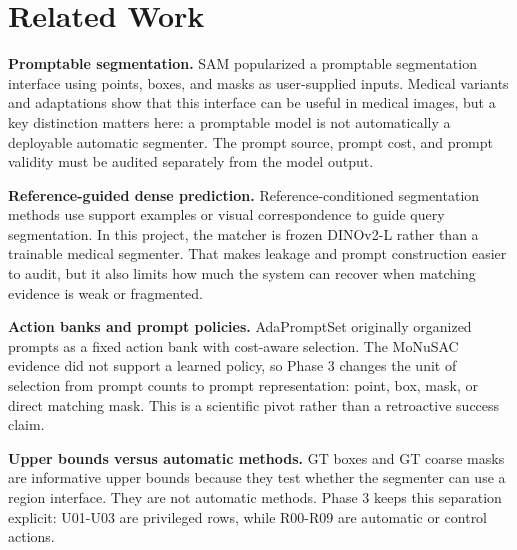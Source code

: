 \section{Related Work}

\textbf{Promptable segmentation.}
SAM popularized a promptable segmentation interface using points, boxes, and masks as user-supplied inputs. Medical variants and adaptations show that this interface can be useful in medical images, but a key distinction matters here: a promptable model is not automatically a deployable automatic segmenter. The prompt source, prompt cost, and prompt validity must be audited separately from the model output.

\textbf{Reference-guided dense prediction.}
Reference-conditioned segmentation methods use support examples or visual correspondence to guide query segmentation. In this project, the matcher is frozen DINOv2-L rather than a trainable medical segmenter. That makes leakage and prompt construction easier to audit, but it also limits how much the system can recover when matching evidence is weak or fragmented.

\textbf{Action banks and prompt policies.}
AdaPromptSet originally organized prompts as a fixed action bank with cost-aware selection. The MoNuSAC evidence did not support a learned policy, so Phase 3 changes the unit of selection from prompt counts to prompt representation: point, box, mask, or direct matching mask. This is a scientific pivot rather than a retroactive success claim.

\textbf{Upper bounds versus automatic methods.}
GT boxes and GT coarse masks are informative upper bounds because they test whether the segmenter can use a region interface. They are not automatic methods. Phase 3 keeps this separation explicit: U01-U03 are privileged rows, while R00-R09 are automatic or control actions.

